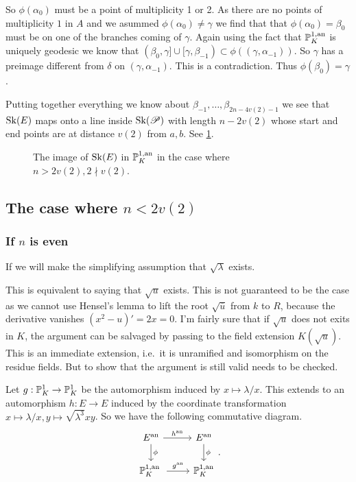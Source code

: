 So $\phi(\alpha_0)$ must be a point of multiplicity 1 or 2. As there are no points of multiplicity $1$ in $A$ and we asummed $\phi(\alpha_0)\ne \gamma$ we find that that $\phi(\alpha_0) = \beta_0$ must be on one of the branches coming of $\gamma$. 
Again using the fact that $\mathbb{P}^{1, \text{an}}_K$ is uniquely geodesic we know that $(\beta_0, \gamma] \cup [\gamma, \beta_{-1}) \subset  \phi((\gamma, \alpha_{-1}))$. 
So $\gamma$ has a preimage different from $\delta$ on $(\gamma, \alpha_{-1})$. 
This is a contradiction. 
Thus $\phi(\beta_0) = \gamma$. 

Putting together everything we know about $\beta_{-1}, \ldots, \beta_{2n - 4v(2)-1}$ we see that $\operatorname{Sk}(E)$ maps onto a line inside $\operatorname{Sk}(\mathscr P)$ with length $n- 2v(2)$ whose start and end points are at distance $v(2)$ from $a, b$.
See \cref{fig:image_between_skeleta_wild_ims}.
\begin{figure}[h]
    \centering
    \caption{The image of $\operatorname{Sk}(E)$ in  $\mathbb{P}^{1, \text{an}}_K$ in the case where $n > 2v(2), 2 \nmid v(2)$.}
    \label{fig:image_between_skeleta_wild_ims}
\end{figure}

\subsection{The case where $n < 2 v(2)$} \label{sec:the_case_where_n_<_2_v2}

\subsubsection{If $n$ is even} \label{sec:if_$n$_is_even}

If we will make the simplifying assumption that $\sqrt{\lambda} $ exists. 
\begin{remark}
	This is equivalent to saying that $\sqrt{u} $ exists.
	This is not guaranteed to be the case as we cannot use Hensel's lemma to lift the root $\sqrt{\overline{u}} $ from $k$ to $R$, because the derivative vanishes $(x^2 - u)' = 2x = 0$. 
	I'm fairly sure that if $\sqrt{u} $ does not exits in $ K$, the argument can be salvaged by passing to the field extension $K(\sqrt{u} )$. 
	This is an immediate extension, i.e.\ it is unramified and isomorphism on the residue fields. 
	But to show that the argument is still valid needs to be checked.
\end{remark}

Let $g: \mathbb{P}^{1}_K \to \mathbb{P}^{1}_K$ be the automorphism induced by $x \mapsto \lambda / x$. 
This extends to an automorphism $h: E \to E$ induced by the coordinate transformation $x \mapsto  \lambda / x, y\mapsto \sqrt{\lambda ^3} x y$. 
So we have the following commutative diagram.
\[
\begin{tikzcd}
	E\an \rar{h\an} \dar{\phi} & E\an \dar{\phi} \\
	\pro^{1, \text{an }}_K \rar{g\an} & \pro^{1, \text{an}}_K
\end{tikzcd}
.\] 

